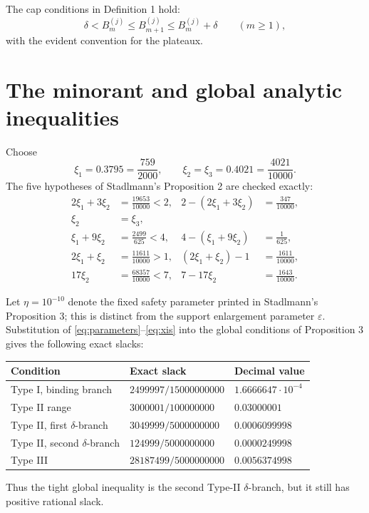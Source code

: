 \documentclass[11pt]{article}
\theoremstyle{definition}
\theoremstyle{remark}
\newcommand{\eps}{\varepsilon}
\newcommand{\etaP}{\eta}
\begin{document}
The cap conditions in Definition 1 hold:
\[
 \delta<B^{(j)}_m\leq B^{(j)}_{m+1}\leq B^{(j)}_m+\delta
 \qquad(m\geq1),
\]
with the evident convention for the plateaux.

\section{The minorant and global analytic inequalities}
\label{sec:analytic-checks}

Choose
\begin{equation}
\label{eq:xis}
 \xi_1=0.3795=\frac{759}{2000},\qquad
 \xi_2=\xi_3=0.4021=\frac{4021}{10000}.
\end{equation}
The five hypotheses of Stadlmann's Proposition 2 are checked exactly:
\begin{align*}
 2\xi_1+3\xi_2&=\frac{19653}{10000}<2,
   &2-(2\xi_1+3\xi_2)&=\frac{347}{10000},\\
 \xi_2&=\xi_3,\\
 \xi_1+9\xi_2&=\frac{2499}{625}<4,
   &4-(\xi_1+9\xi_2)&=\frac1{625},\\
 2\xi_1+\xi_2&=\frac{11611}{10000}>1,
   &(2\xi_1+\xi_2)-1&=\frac{1611}{10000},\\
 17\xi_2&=\frac{68357}{10000}<7,
   &7-17\xi_2&=\frac{1643}{10000}.
\end{align*}

Let \(\etaP=10^{-10}\) denote the fixed safety parameter printed in
Stadlmann's Proposition 3; this is distinct from the support enlargement
parameter \(\eps\).  Substitution of \eqref{eq:parameters}--\eqref{eq:xis}
into the global conditions of Proposition 3 gives the following exact slacks:
\begin{center}
\begin{tabular}{lll}
\toprule
Condition & Exact slack & Decimal value\\
\midrule
Type I, binding branch & \(2499997/15000000000\) & \(1.6666647\cdot10^{-4}\)\\
Type II range & \(3000001/100000000\) & \(0.03000001\)\\
Type II, first \(\delta\)-branch & \(3049999/5000000000\) & \(0.0006099998\)\\
Type II, second \(\delta\)-branch & \(124999/5000000000\) & \(0.0000249998\)\\
Type III & \(28187499/5000000000\) & \(0.0056374998\)\\
\bottomrule
\end{tabular}
\end{center}
Thus the tight global inequality is the second Type-II \(\delta\)-branch, but
it still has positive rational slack.
\end{document}
